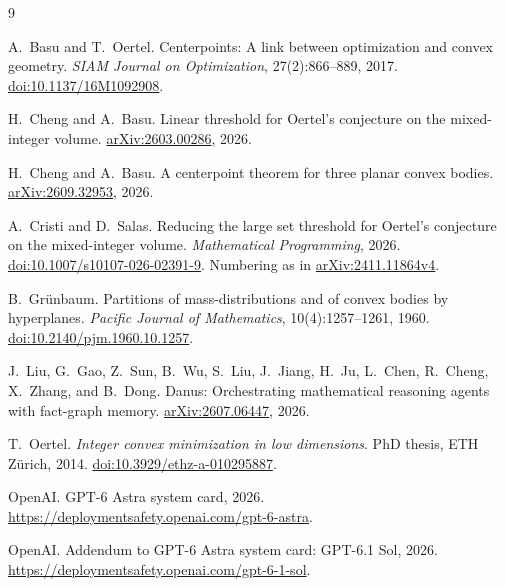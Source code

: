 \documentclass[11pt]{article}
\newcommand{\1}{\mathbf{1}}
\begin{document}
\small
\begin{thebibliography}{9}
\setlength{\itemsep}{2pt}
\raggedright
{}
A.~Basu and T.~Oertel. Centerpoints: A link between optimization and convex geometry. \emph{SIAM Journal on
Optimization}, 27(2):866--889, 2017. \href{https://doi.org/10.1137/16M1092908}{doi:10.1137/16M1092908}.

H.~Cheng and A.~Basu. Linear threshold for Oertel's conjecture on the mixed-integer volume.
\href{https://arxiv.org/abs/2603.00286}{arXiv:2603.00286}, 2026.

H.~Cheng and A.~Basu. A centerpoint theorem for three planar convex bodies.
\href{https://arxiv.org/abs/2609.32953}{arXiv:2609.32953}, 2026.

A.~Cristi and D.~Salas. Reducing the large set threshold for Oertel's conjecture on the mixed-integer volume.
\emph{Mathematical Programming}, 2026.
\href{https://doi.org/10.1007/s10107-026-02391-9}{doi:10.1007/s10107-026-02391-9}. Numbering as in
\href{https://arxiv.org/abs/2411.11864v4}{arXiv:2411.11864v4}.

B.~Gr\"unbaum. Partitions of mass-distributions and of convex bodies by hyperplanes. \emph{Pacific Journal of
Mathematics}, 10(4):1257--1261, 1960. \href{https://doi.org/10.2140/pjm.1960.10.1257}{doi:10.2140/pjm.1960.10.1257}.

J.~Liu, G.~Gao, Z.~Sun, B.~Wu, S.~Liu, J.~Jiang, H.~Ju, L.~Chen, R.~Cheng, X.~Zhang, and B.~Dong. Danus: Orchestrating
mathematical reasoning agents with fact-graph memory. \href{https://arxiv.org/abs/2607.06447}{arXiv:2607.06447}, 2026.

T.~Oertel. \emph{Integer convex minimization in low dimensions}. PhD thesis, ETH Z\"urich, 2014.
\href{https://doi.org/10.3929/ethz-a-010295887}{doi:10.3929/ethz-a-010295887}.

OpenAI. GPT-6 Astra system card, 2026. \url{https://deploymentsafety.openai.com/gpt-6-astra}.

OpenAI. Addendum to GPT-6 Astra system card: GPT-6.1 Sol, 2026. \url{https://deploymentsafety.openai.com/gpt-6-1-sol}.
\end{thebibliography}
\end{document}
